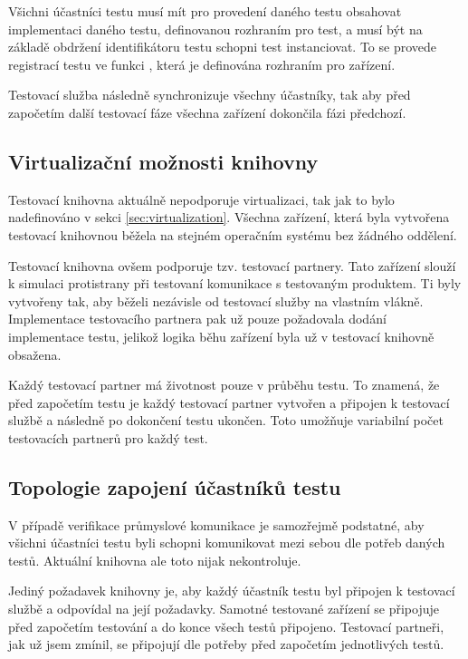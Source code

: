 Všichni účastníci testu musí mít pro provedení daného testu obsahovat implementaci daného testu, definovanou rozhraním pro test, a musí být na základě obdržení identifikátoru testu schopni test instanciovat. To se provede registrací testu ve funkci , která je definována rozhraním pro zařízení.

Testovací služba následně synchronizuje všechny účastníky, tak aby před započetím další testovací fáze všechna zařízení dokončila fázi předchozí. 

\subsection{Virtualizační možnosti knihovny}

Testovací knihovna aktuálně nepodporuje virtualizaci, tak jak to bylo nadefinováno v sekci \ref{sec:virtualization}. Všechna zařízení, která byla vytvořena testovací knihovnou běžela na stejném operačním systému bez žádného oddělení.

Testovací knihovna ovšem podporuje tzv. testovací partnery. Tato zařízení slouží k simulaci protistrany při testovaní komunikace s testovaným produktem. Ti byly vytvořeny tak, aby běželi nezávisle od testovací služby na vlastním vlákně. Implementace testovacího partnera pak už pouze požadovala dodání implementace testu, jelikož logika běhu zařízení byla už v testovací knihovně obsažena.

Každý testovací partner má životnost pouze v průběhu testu. To znamená, že před započetím testu je každý testovací partner vytvořen a připojen k testovací službě a následně po dokončení testu ukončen. Toto umožňuje variabilní počet testovacích partnerů pro každý test.

\subsection{Topologie zapojení účastníků testu}

V případě verifikace průmyslové komunikace je samozřejmě podstatné, aby všichni účastníci testu byli schopni komunikovat mezi sebou dle potřeb daných testů. Aktuální knihovna ale toto nijak nekontroluje. 

Jediný požadavek knihovny je, aby každý účastník testu byl připojen k testovací službě a odpovídal na její požadavky. Samotné testované zařízení se připojuje před započetím testování a do konce všech testů připojeno. Testovací partneři, jak už jsem zmínil, se připojují dle potřeby před započetím jednotlivých testů.

